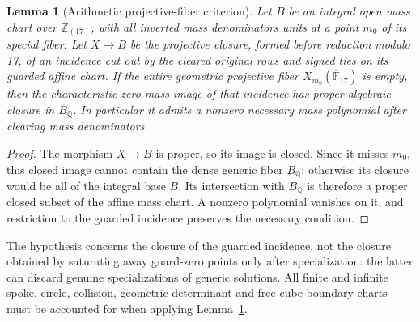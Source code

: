 \documentclass[11pt]{amsart}
\newtheorem{lemma}[theorem]{Lemma}
\theoremstyle{remark}
\begin{document}
\begin{lemma}[Arithmetic projective-fiber criterion]\label{lem:no94-projective-fiber}
Let $B$ be an integral open mass chart over $\mathbb Z_{(17)}$, with all inverted mass denominators units at a point $m_0$ of its special fiber. Let $X\to B$ be the projective closure, formed before reduction modulo 17, of an incidence cut out by the cleared original rows and signed ties on its guarded affine chart. If the entire geometric projective fiber $X_{m_0}(\overline{\mathbb F}_{17})$ is empty, then the characteristic-zero mass image of that incidence has proper algebraic closure in $B_{\mathbb Q}$. In particular it admits a nonzero necessary mass polynomial after clearing mass denominators.
\end{lemma}
\begin{proof}
The morphism $X\to B$ is proper, so its image is closed. Since it misses $m_0$, this closed image cannot contain the dense generic fiber $B_{\mathbb Q}$; otherwise its closure would be all of the integral base $B$. Its intersection with $B_{\mathbb Q}$ is therefore a proper closed subset of the affine mass chart. A nonzero polynomial vanishes on it, and restriction to the guarded incidence preserves the necessary condition.
\end{proof}
The hypothesis concerns the closure of the guarded incidence, not the closure obtained by saturating away guard-zero points only after specialization: the latter can discard genuine specializations of generic solutions. All finite and infinite spoke, circle, collision, geometric-determinant and free-cube boundary charts must be accounted for when applying Lemma~\ref{lem:no94-projective-fiber}.
\end{document}

